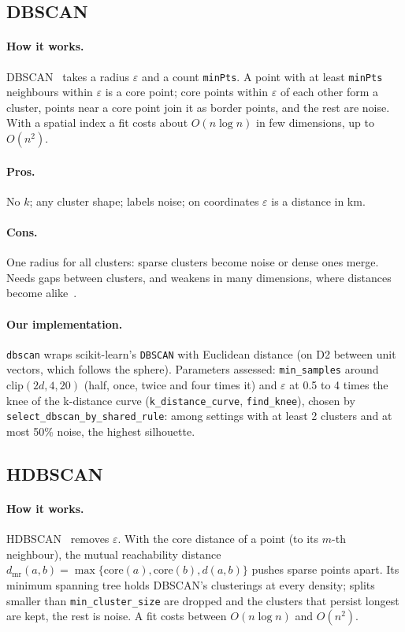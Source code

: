 \subsection{DBSCAN}
\paragraph{How it works.} DBSCAN~\cite{ester1996} takes a radius $\varepsilon$ and a count \texttt{minPts}.
A point with at least \texttt{minPts} neighbours within $\varepsilon$ is a core point; core points within
$\varepsilon$ of each other form a cluster, points near a core point join it as border points, and the
rest are noise. With a spatial index a fit costs about $O(n\log n)$ in few dimensions, up to $O(n^2)$.
\paragraph{Pros.} No $k$; any cluster shape; labels noise; on coordinates $\varepsilon$ is a distance in km.
\paragraph{Cons.} One radius for all clusters: sparse clusters become noise or dense ones merge. Needs
gaps between clusters, and weakens in many dimensions, where distances become alike~\cite{beyer1999}.
\paragraph{Our implementation.} \texttt{dbscan} wraps scikit-learn's \texttt{DBSCAN} with Euclidean
distance (on D2 between unit vectors, which follows the sphere). Parameters assessed: \texttt{min\_samples}
around $\mathrm{clip}(2d,4,20)$ (half, once, twice and four times it) and $\varepsilon$ at
0.5 to 4 times the knee of the k-distance curve (\texttt{k\_distance\_curve}, \texttt{find\_knee}),
chosen by \texttt{select\_dbscan\_by\_shared\_rule}: among settings with at least 2 clusters and at most
50\% noise, the highest silhouette.

\subsection{HDBSCAN}
\paragraph{How it works.} HDBSCAN~\cite{campello2013} removes $\varepsilon$. With the core distance of
a point (to its $m$-th neighbour), the mutual reachability distance
$d_{\mathrm{mr}}(a,b)=\max\{\mathrm{core}(a),\mathrm{core}(b),d(a,b)\}$ pushes sparse points apart. Its
minimum spanning tree holds DBSCAN's clusterings at every density; splits smaller than
\texttt{min\_cluster\_size} are dropped and the clusters that persist longest are kept, the rest is
noise. A fit costs between $O(n\log n)$ and $O(n^2)$.
